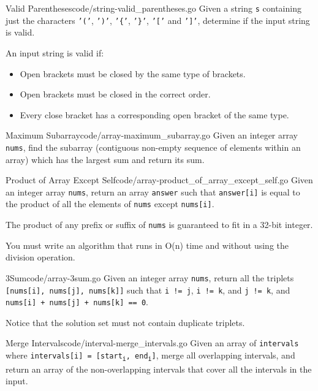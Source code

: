 \documentclass[10pt]{report}
\newcommand{\var}[1]{\texttt{#1}}
\begin{document}
\begin{problem}{Valid Parentheses}{code/string-valid_parentheses.go}
Given a string \var{s} containing just the characters \var{'('}, \var{')'}, \var{'\{'}, \var{'\}'}, \var{'['} and \var{']'}, determine if the input string is valid.

An input string is valid if:

\begin{itemize}
    \item Open brackets must be closed by the same type of brackets.
    \item Open brackets must be closed in the correct order.
    \item Every close bracket has a corresponding open bracket of the same type.
\end{itemize}
\end{problem}

\begin{problem}{Maximum Subarray}{code/array-maximum_subarray.go}
Given an integer array \var{nums}, find the subarray (contiguous non-empty sequence of elements within an array) which has the largest sum and return its sum.
\end{problem}

\begin{problem}{Product of Array Except Self}{code/array-product_of_array_except_self.go}
Given an integer array \var{nums}, return an array \var{answer} such that \var{answer[i]} is equal to the product of all the elements of \var{nums} except \var{nums[i]}.

The product of any prefix or suffix of \var{nums} is guaranteed to fit in a 32-bit integer.

You must write an algorithm that runs in O(n) time and without using the division operation.
\end{problem}

\begin{problem}{3Sum}{code/array-3sum.go}
Given an integer array \var{nums}, return all the triplets \var{[nums[i], nums[j], nums[k]]} such that \var{i != j}, \var{i != k}, and \var{j != k}, and \var{nums[i] + nums[j] + nums[k] == 0}.

Notice that the solution set must not contain duplicate triplets.
\end{problem}

\begin{problem}{Merge Intervals}{code/interval-merge_intervals.go}
Given an array of \var{intervals} where \var{intervals[i] = [start\textsubscript{i}, end\textsubscript{i}]}, merge all overlapping intervals, and return an array of the non-overlapping intervals that cover all the intervals in the input.
\end{problem}
\end{document}
